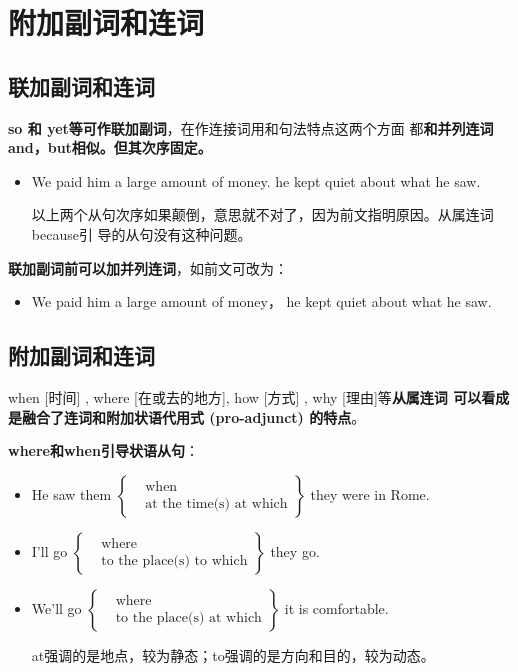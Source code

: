 \section{附加副词和连词}
\subsection{联加副词和连词}

\textbf{so 和 yet等可作联加副词}，在作连接词用和句法特点这两个方面
都\textbf{和并列连词and，but相似。但其次序固定。}
\begin{itemize}
\item We paid him a large amount of money.  he kept quiet about what he saw.

  以上两个从句次序如果颠倒，意思就不对了，因为前文指明原因。从属连词because引
  导的从句没有这种问题。
\end{itemize}

\textbf{联加副词前可以加并列连词}，如前文可改为：
\begin{itemize}
\item We paid him a large amount of money，  he kept quiet about what he saw.
\end{itemize}

\subsection{附加副词和连词}

when [时间] , where [在或去的地方], how [方式] , why [理由]等\textbf{从属连词
  可以看成是融合了连词和附加状语代用式 (pro-adjunct) 的特点}。

\textbf{where和when引导状语从句}：
\begin{itemize}
\item He saw them
    $\left\{
      \begin{aligned}
        &\text{when}\\
        &\text{at the time(s) at which}
      \end{aligned}
      \right\} $ they were in Rome.

\item I'll go
    $\left\{
      \begin{aligned}
        &\text{where}\\
        &\text{to the place(s) to which}
      \end{aligned}
      \right\} $ they go.

\item We'll go
    $\left\{
      \begin{aligned}
        &\text{where}\\
        &\text{to the place(s) at which}
      \end{aligned}
      \right\} $ it is comfortable.

      at强调的是地点，较为静态；to强调的是方向和目的，较为动态。
\end{itemize}

